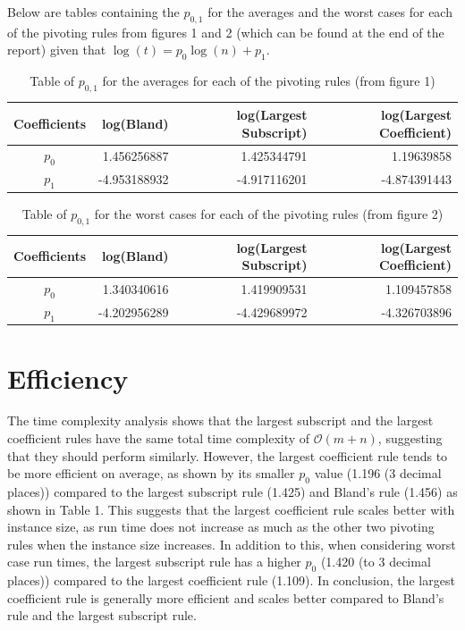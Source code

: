 \documentclass[a4paper]{article}
\numberwithin{equation}{section}
\begin{document}
Below are tables containing the $p_{0,1}$ for the averages and the worst cases for each of the pivoting rules from figures 1 and 2 (which can be found at the end of the report) given that $\log(t) = p_{0} \log(n) + p_{1}$.
\begin{table}[H]
  \caption{Table of $p_{0,1}$ for the averages for each of the pivoting rules (from figure 1)}
  \begin{center}
    \begin{tabular}{c|rrr}
      Coefficients& log(Bland)& log(Largest Subscript)& log(Largest Coefficient)\\
      \hline
      $p_0$& 1.456256887& 1.425344791& 1.19639858\\
      $p_1$& -4.953188932& -4.917116201& -4.874391443\\
    \end{tabular}
  \end{center}
\label{tab:average}
\end{table}
\begin{table}[H]
  \caption{Table of $p_{0,1}$ for the worst cases for each of the pivoting rules (from figure 2)}
  \begin{center}
    \begin{tabular}{c|rrr}
      Coefficients& log(Bland)& log(Largest Subscript)& log(Largest Coefficient)\\
      \hline
      $p_0$& 1.340340616& 1.419909531& 1.109457858\\
      $p_1$& -4.202956289& -4.429689972& -4.326703896\\
    \end{tabular}
  \end{center}
\label{tab:worst}
\end{table}

\section{Efficiency}
\label{sec:efficiency}


The time complexity analysis shows that the largest subscript and the largest coefficient rules have the same total time complexity of $\mathcal{O}(m+n)$, suggesting that they should perform similarly. However, the largest coefficient rule tends to be more efficient on average, as shown by its smaller $p_0$ value (1.196 (3 decimal places)) compared to the largest subscript rule (1.425) and Bland's rule (1.456) as shown in Table 1. This suggests that the largest coefficient rule scales better with instance size, as run time does not increase as much as the other two pivoting rules when the instance size increases. In addition to this, when considering worst case run times, the largest subscript rule has a higher $p_0$ (1.420 (to 3 decimal places)) compared to the largest coefficient rule (1.109). In conclusion, the largest coefficient rule is generally more efficient and scales better compared to Bland's rule and the largest subscript rule.
\end{document}
